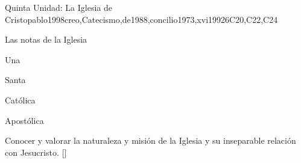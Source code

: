 \begin{syllabus}
\begin{unit}{}{Quinta Unidad: La Iglesia de Cristo}{pablo1998creo,Catecismo,de1988,concilio1973,xvi1992}{6}{C20,C22,C24}
\begin{topics}
	\item Las notas de la Iglesia
		\begin{subtopics}
		\item Una
		\item Santa
		\item Católica
		\item Apostólica
	    \end{subtopics}
\end{topics}
\begin{learningoutcomes}
	\item Conocer y valorar la naturaleza y misión de la Iglesia y su inseparable relación con Jesucristo. [\Familiarity]
\end{learningoutcomes}
\end{unit}



\begin{coursebibliography}
\end{coursebibliography}

\end{syllabus}
